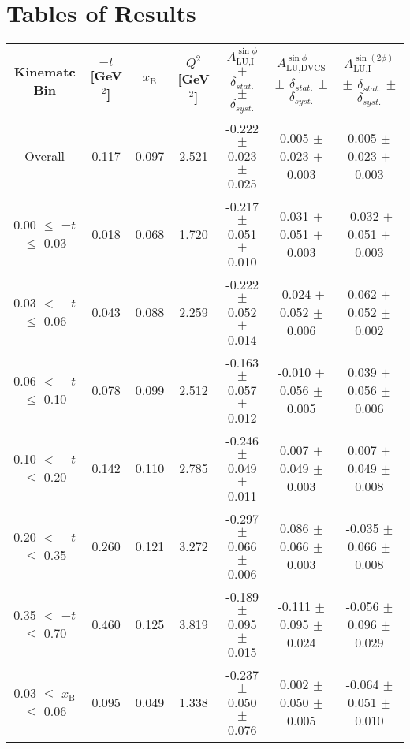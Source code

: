 \appendix
\appendixpage
\addappheadtotoc
\setcounter{equation}{0}

\section{Tables of Results}


\begin{table}[width=15cm]
 \begin{center}
\resizebox{16cm}{!} {
  \begin{tabular}{|c|c|c|c|c|c|c|}
\hline
Kinematc Bin &  $-t$ [GeV$^{2}$] & $x_{\textrm{B}}$ & $Q^{2}$ [GeV$^{2}$] & 
$A_{\textrm{LU,I}}^{\sin\phi}$ $\pm$ $\delta_{stat.}$ $\pm$ $\delta_{syst.}$ & $A_{\textrm{LU,DVCS}}^{\sin\phi}$ $\pm$ $\delta_{stat.}$ $\pm$ $\delta_{syst.}$
& $A_{\textrm{LU,I}}^{\sin(2\phi)}$ $\pm$ $\delta_{stat.}$ $\pm$ $\delta_{syst.}$ \\
\hline
\hline
Overall &  0.117 & 0.097 &  2.521 &  -0.222  $\pm$  0.023  $\pm$   0.025 &
 0.005  $\pm$  0.023  $\pm$  0.003 & 0.005  $\pm$  0.023  $\pm$   0.003 \\
\hline
0.00 $\leqslant$ $-t$ $\leqslant$ 0.03 &  0.018 & 0.068 &  1.720 &  -0.217  $\pm$  0.051  $\pm$   0.010 &
 0.031  $\pm$  0.051   $\pm$  0.003 & -0.032  $\pm$  0.051  $\pm$   0.003\\
0.03 $<$ $-t$ $\leqslant$ 0.06 &  0.043 & 0.088 &  2.259&  -0.222 $\pm$   0.052   $\pm$  0.014 &
 -0.024 $\pm$   0.052  $\pm$   0.006 & 0.062  $\pm$  0.052  $\pm$   0.002\\
0.06 $<$ $-t$ $\leqslant$ 0.10 &  0.078 & 0.099 &  2.512 & -0.163 $\pm$   0.057   $\pm$  0.012 &
 -0.010  $\pm$  0.056  $\pm$   0.005 & 0.039  $\pm$  0.056   $\pm$  0.006 \\
0.10 $<$ $-t$ $\leqslant$ 0.20 &  0.142 & 0.110 &  2.785 &  -0.246 $\pm$   0.049  $\pm$   0.011 &
0.007  $\pm$  0.049  $\pm$   0.003 & 0.007  $\pm$  0.049  $\pm$  0.008\\
0.20 $<$ $-t$ $\leqslant$ 0.35 &  0.260 & 0.121 &  3.272 &  -0.297 $\pm$   0.066  $\pm$   0.006 &
0.086  $\pm$  0.066  $\pm$   0.003 & -0.035 $\pm$   0.066   $\pm$  0.008\\
0.35 $<$ $-t$ $\leqslant$ 0.70 &  0.460 & 0.125 &  3.819 &  -0.189  $\pm$  0.095  $\pm$   0.015 & 
-0.111  $\pm$  0.095   $\pm$  0.024 & -0.056 $\pm$   0.096  $\pm$   0.029\\
\hline
0.03 $\leqslant$ $x_{\textrm{B}}$ $\leqslant$ 0.06 &  0.095 & 0.049 &  1.338 &  -0.237  $\pm$  0.050  $\pm$   0.076 &
0.002 $\pm$   0.050  $\pm$   0.005 & -0.064  $\pm$  0.051  $\pm$   0.010\\

\end{tabular}}
\end{center}
\end{table}
